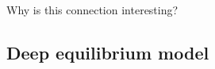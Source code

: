 \documentclass[8pt, t,
aspectratio=169,%
]{beamer}
\begin{document}
\begin{frame}{Why is this connection interesting?}
\end{frame}


\subsection{Deep equilibrium model}

    
\end{document}
